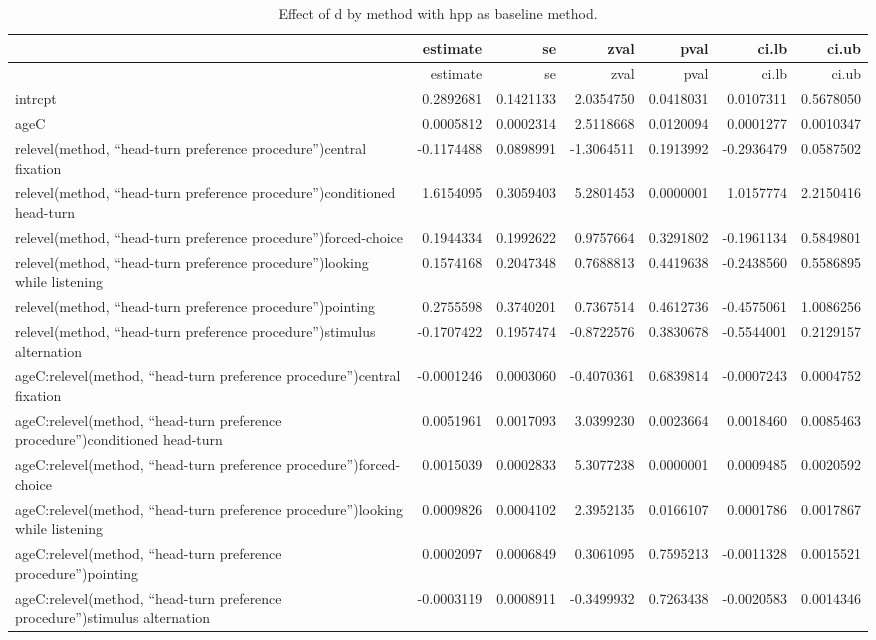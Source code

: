 \documentclass[english,floatsintext,man]{apa6}
\begin{document}
\begin{longtable}[]{@{}lrrrrrr@{}}
\caption{Effect of d by method with hpp as baseline
method.}\tabularnewline
\toprule
& estimate & se & zval & pval & ci.lb & ci.ub\tabularnewline
\midrule
\endfirsthead
\toprule
& estimate & se & zval & pval & ci.lb & ci.ub\tabularnewline
\midrule
\endhead
intrcpt & 0.2892681 & 0.1421133 & 2.0354750 & 0.0418031 & 0.0107311 &
0.5678050\tabularnewline
ageC & 0.0005812 & 0.0002314 & 2.5118668 & 0.0120094 & 0.0001277 &
0.0010347\tabularnewline
relevel(method, \enquote{head-turn preference procedure})central
fixation & -0.1174488 & 0.0898991 & -1.3064511 & 0.1913992 & -0.2936479
& 0.0587502\tabularnewline
relevel(method, \enquote{head-turn preference procedure})conditioned
head-turn & 1.6154095 & 0.3059403 & 5.2801453 & 0.0000001 & 1.0157774 &
2.2150416\tabularnewline
relevel(method, \enquote{head-turn preference procedure})forced-choice &
0.1944334 & 0.1992622 & 0.9757664 & 0.3291802 & -0.1961134 &
0.5849801\tabularnewline
relevel(method, \enquote{head-turn preference procedure})looking while
listening & 0.1574168 & 0.2047348 & 0.7688813 & 0.4419638 & -0.2438560 &
0.5586895\tabularnewline
relevel(method, \enquote{head-turn preference procedure})pointing &
0.2755598 & 0.3740201 & 0.7367514 & 0.4612736 & -0.4575061 &
1.0086256\tabularnewline
relevel(method, \enquote{head-turn preference procedure})stimulus
alternation & -0.1707422 & 0.1957474 & -0.8722576 & 0.3830678 &
-0.5544001 & 0.2129157\tabularnewline
ageC:relevel(method, \enquote{head-turn preference procedure})central
fixation & -0.0001246 & 0.0003060 & -0.4070361 & 0.6839814 & -0.0007243
& 0.0004752\tabularnewline
ageC:relevel(method, \enquote{head-turn preference
procedure})conditioned head-turn & 0.0051961 & 0.0017093 & 3.0399230 &
0.0023664 & 0.0018460 & 0.0085463\tabularnewline
ageC:relevel(method, \enquote{head-turn preference
procedure})forced-choice & 0.0015039 & 0.0002833 & 5.3077238 & 0.0000001
& 0.0009485 & 0.0020592\tabularnewline
ageC:relevel(method, \enquote{head-turn preference procedure})looking
while listening & 0.0009826 & 0.0004102 & 2.3952135 & 0.0166107 &
0.0001786 & 0.0017867\tabularnewline
ageC:relevel(method, \enquote{head-turn preference procedure})pointing &
0.0002097 & 0.0006849 & 0.3061095 & 0.7595213 & -0.0011328 &
0.0015521\tabularnewline
ageC:relevel(method, \enquote{head-turn preference procedure})stimulus
alternation & -0.0003119 & 0.0008911 & -0.3499932 & 0.7263438 &
-0.0020583 & 0.0014346\tabularnewline
\bottomrule
\end{longtable}
\end{document}
